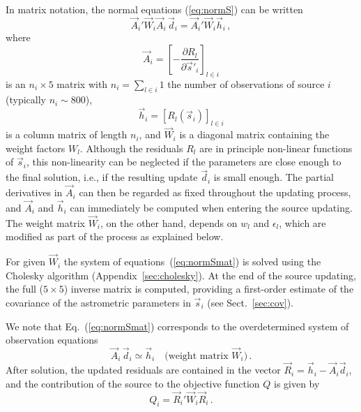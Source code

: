 \documentclass[structabstract]{aa}
\begin{document}
In matrix notation, the normal equations (\ref{eq:normS}) can be written
\begin{equation} \label{eq:normSmat}
\vec{A}_i' \vec{W}_i \vec{A}_i\,\vec{d}_i = \vec{A}_i' \vec{W}_i \vec{h}_i \, ,
\end{equation}
where
\begin{equation} \label{eq:designS}
\vec{A}_i=\left[ -\frac{\partial R_l}{\partial\vec{s}'_{\!i}} \right]_{l\in i}
\end{equation}
is an $n_i\times 5$ matrix with $n_i=\sum_{l\in i}1$ the number
of observations of source $i$ (typically $n_i\sim 800$),
\begin{equation} \label{eq:designSrhs}
\vec{h}_i=\left[ R_l(\vec{s}_i) \right]_{l\in i}
\end{equation}
is a column matrix of length $n_i$, and $\vec{W}_i$ is a diagonal matrix
containing the weight factors $W_l$. Although the residuals $R_l$
are in principle non-linear functions of $\vec{s}_i$, this non-linearity can
be neglected if the parameters are close enough to the final solution, 
i.e., if the resulting update $\vec{d}_i$ is small enough. The
partial derivatives in $\vec{A}_i$ can then be regarded as fixed throughout
the updating process, and $\vec{A}_i$ and $\vec{h}_i$ can immediately 
be computed when entering the source updating. The weight matrix 
$\vec{W}_i$, on the other hand, depends on $w_l$ and $\epsilon_l$, 
which are modified as part of the process as explained below. 

For given $\vec{W}_i$ the system of equations~(\ref{eq:normSmat}) is solved 
using the Cholesky algorithm (Appendix~\ref{sec:cholesky}). At the end of
the source updating, the full ($5\times 5$) inverse matrix is computed, 
providing a first-order estimate of the covariance of the astrometric parameters 
in $\vec{s}_i$ (see Sect.~\ref{sec:cov}).

We note that Eq.~(\ref{eq:normSmat}) corresponds to the overdetermined 
system of observation equations
\begin{equation} \label{eq:obseqS}
\vec{A}_i\,\vec{d}_i \simeq \vec{h}_i \quad\text{(weight~matrix~$\vec{W}_i$)} \, .
\end{equation}
After solution, the updated residuals are contained in the vector
$\vec{R}_i=\vec{h}_i-\vec{A}_i\vec{d}_i$, and the contribution of the source
to the objective function $Q$ is given by
\begin{equation} \label{eq:Qi}
Q_i = \vec{R}_i' \vec{W}_i \vec{R}_i \, .
\end{equation}
\end{document}

